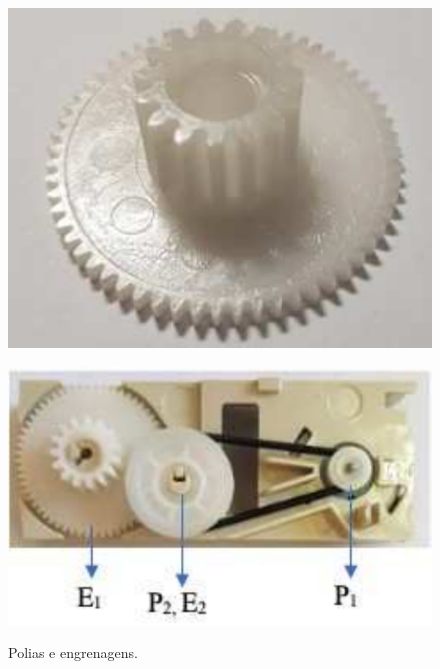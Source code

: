 \documentclass{textolivre}
\begin{document}
\begin{enumerate}
\begin{figure}[h!]
\begin{minipage}{0.2\textwidth}
    \label{fig17b}
    \end{minipage}
    \hfill
    \begin{minipage}{0.2\textwidth} 
    \includegraphics[width=\linewidth]{figure-26.pdf}
    \label{fig17c}
    \end{minipage}
    \hfill
    \begin{minipage}{0.33\textwidth} 
    \includegraphics[width=\linewidth]{figure-27.pdf}
    \label{fig17d}
    \end{minipage}
    \caption{Polias e engrenagens.}
    \label{fig17}
    \end{figure}


\end{enumerate}
\end{document}
